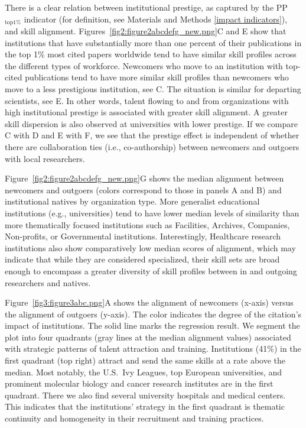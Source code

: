 \documentclass[draft,final]{vutinfth} %
\begin{document}
There is a clear relation between institutional prestige, as captured by the {PP}$_\mathrm{top1\%}$ indicator (for definition, see  Materials and Methods \ref{impact indicators}), and skill alignment. Figures~\ref{fig2:figure2abcdefg_new.png}C and E show that institutions that have substantially more than one percent of their publications in the top 1\% most cited papers worldwide tend to have similar skill profiles across the different types of workforce. Newcomers who move to an institution with top-cited publications tend to have more similar skill profiles than newcomers who move to a less prestigious institution, see C. The situation is similar for departing scientists, see E. In other words, talent flowing to and from organizations with high institutional prestige is associated with greater skill alignment. A greater skill dispersion is also observed at universities with lower prestige. If we compare C with D and E with F, we see that the prestige effect is independent of whether there are collaboration ties (i.e., co-authorship) between newcomers and outgoers with local researchers.

Figure~\ref{fig2:figure2abcdefg_new.png}G shows the median alignment between newcomers and outgoers (colors correspond to those in panels A and B) and institutional natives by organization type. More generalist educational institutions (e.g., universities) tend to have lower median levels of similarity than more thematically focused institutions such as Facilities, Archives, Companies, Non-profits, or Governmental institutions. Interestingly, Healthcare research institutions also show comparatively low median scores of alignment, which may indicate that while they are considered specialized, their skill sets are broad enough to encompass a greater diversity of skill profiles between in and outgoing researchers and natives.

Figure~\ref{fig3:figure3abc.png}A shows the alignment of newcomers (x-axis) versus the alignment of outgoers (y-axis). The color indicates the degree of the citation's impact of institutions. The solid line marks the regression result. We segment the plot into four quadrants (gray lines at the median alignment values) associated with strategic patterns of talent attraction and training. Institutions (41\%) in the first quadrant (top right) attract and send the same skills at a rate above the median. Most notably, the U.S.\ Ivy Leagues, top European universities, and prominent molecular biology and cancer research institutes are in the first quadrant. There we also find several university hospitals and medical centers. This indicates that the institutions' strategy in the first quadrant is thematic continuity \cite{heinze2008sponsor, march1991exploration} and homogeneity in their recruitment and training practices. 
\end{document}
